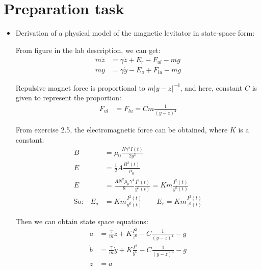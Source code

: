 \documentclass[10pt,a4paper]{article}
\begin{document}
\begin{titlepage}

\end{titlepage}
\newpage
\pagestyle{plain}

\section{Preparation task}
\begin{itemize}
    \item Derivation of a physical model of the magnetic levitator in state-space form:
    \par From figure in the lab description, we can get:
	\begin{align*}
		m \ddot{z} &= \gamma \dot{z} + E_{r} - F_{ul} - mg \\
		m \ddot{y} &= \gamma \dot{y} - E_{a} + F_{lu} - mg
	\end{align*}
	\par Repulsive magnet force is proportional to $m \vert y - z \vert^{-4}$, and here, constant $C$ is given to represent the proportion:
	\begin{align*}
		F_{ul} &= F_{lu} = C m \frac{1}{(y - z)^{4}}
	\end{align*}
	\par From exercise 2.5, the electromagnetic force can be obtained, where $K$ is a constant:	
	\begin{align*}
		B &= \mu_{0} \frac{N \gamma^{2} I(t)}{2 y^{3}} \\
		E &= \frac{1}{2} A \frac{B^{2}(t)}{\mu_{0}} \\
		E &= \frac{A N^{2} \mu_{0} \gamma^{4}}{8} \frac{I^{2}(t)}{y^{6}(t)} = K m \frac{I^{2}(t)}{y^{6}(t)} \\
		\text{So:} \quad E_{a} &= K m \frac{I^{2}(t)}{y^{6}(t)} \qquad E_{r} = K m \frac{I^{2}(t)}{z^{6}(t)}
	\end{align*}
	\par Then we can obtain state space equations:
	\begin{align*}
		\dot{a} &= \frac{\gamma}{m} \dot{z} + K \frac{I^{2}}{z^{6}} - C \frac{1}{(y - z)^{4}} - g \\
		\dot{b} &= \frac{\gamma}{m} \dot{y} + K \frac{I^{2}}{y^{6}} - C \frac{1}{(y - z)^{4}} - g \\
		\dot{z} &= a \\

\end{align*}
\end{itemize}
\end{document}
